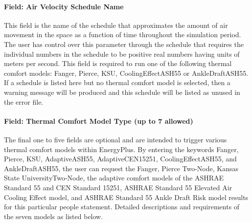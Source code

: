 \paragraph{Field: Air Velocity Schedule Name}\label{field-air-velocity-schedule-name}

This field is the name of the schedule that approximates the amount of air movement in the space as a function of time throughout the simulation period. The user has control over this parameter through the schedule that requires the individual numbers in the schedule to be positive real numbers having units of meters per second. This field is required to run one of the following thermal comfort models: Fanger, Pierce, KSU, CoolingEffectASH55 or AnkleDraftASH55. If a schedule is listed here but no thermal comfort model is selected, then a warning message will be produced and this schedule will be listed as unused in the error file.

\paragraph{Field: Thermal Comfort Model Type (up to 7 allowed)}\label{field-thermal-comfort-model-type-up-to-7-allowed}

The final one to five fields are optional and are intended to trigger various thermal comfort models within EnergyPlus. By entering the keywords Fanger, Pierce, KSU, AdaptiveASH55, AdaptiveCEN15251, CoolingEffectASH55, and AnkleDraftASH55, the user can request the Fanger, Pierce Two-Node, Kansas State UniversityTwo-Node, the adaptive comfort models of the ASHRAE Standard 55 and CEN Standard 15251, ASHRAE Standard 55 Elevated Air Cooling Effect model, and ASHRAE Standard 55 Ankle Draft Risk model results for this particular people statement. Detailed descriptions and requirements of the seven models as listed below.

